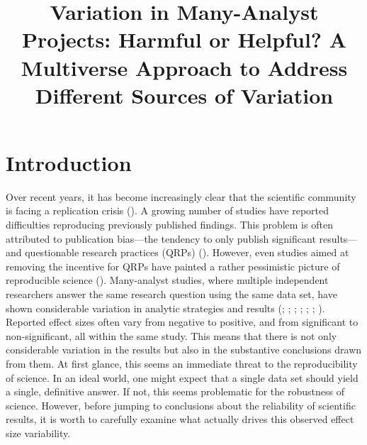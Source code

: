 \documentclass[
  man,
  floatsintext,
  longtable,
  nolmodern,
  notxfonts,
  notimes,
  colorlinks=true,linkcolor=blue,citecolor=blue,urlcolor=blue]{apa7}
\title{Variation in Many-Analyst Projects: Harmful or Helpful? A
Multiverse Approach to Address Different Sources of Variation}
\newlength{\cslhangindent}
\begin{document}
\maketitle




\setlength\LTleft{0pt}



\ifdefined\Shaded\renewenvironment{Shaded}{\begin{snugshade}\begin{singlespace}}{\end{singlespace}\end{snugshade}}\fi

\setlength{\cslhangindent}{0.5in}

\section{Introduction}\label{introduction}

Over recent years, it has become increasingly clear that the scientific
community is facing a replication crisis
(). A growing
number of studies have reported difficulties reproducing previously
published findings. This problem is often attributed to publication
bias---the tendency to only publish significant results---and
questionable research practices (QRPs)
(). However, even
studies aimed at removing the incentive for QRPs have painted a rather
pessimistic picture of reproducible science
().
Many-analyst studies, where multiple independent researchers answer the
same research question using the same data set, have shown considerable
variation in analytic strategies and results
(;
; ;
;
; ; ).
Reported effect sizes often vary from negative to positive, and from
significant to non-significant, all within the same study. This means
that there is not only considerable variation in the results but also in
the substantive conclusions drawn from them. At first glance, this seems
an immediate threat to the reproducibility of science. In an ideal
world, one might expect that a single data set should yield a single,
definitive answer. If not, this seems problematic for the robustness of
science. However, before jumping to conclusions about the reliability of
scientific results, it is worth to carefully examine what actually
drives this observed effect size variability.
\end{document}
